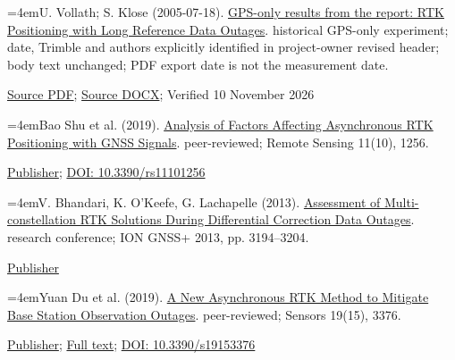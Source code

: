 \documentclass[11pt,a4paper]{article}
\numberwithin{equation}{section}
\numberwithin{figure}{section}
\begin{document}
\begin{samepage}\noindent\hangindent=4emU. Vollath; S. Klose (2005-07-18). \href{../../../references/historical-outage-results/trimble-report.pdf}{GPS-only results from the report: RTK Positioning with Long Reference Data Outages}. historical GPS-only experiment; date, Trimble and authors explicitly identified in project-owner revised header; body text unchanged; PDF export date is not the measurement date.
{\small \href{../../../references/historical-outage-results/trimble-report.pdf}{Source PDF}; \href{../../../references/historical-outage-results/trimble-report.docx}{Source DOCX}; Verified 10 November 2026\par}
\end{samepage}\medskip
\begin{samepage}\noindent\hangindent=4emBao Shu et al. (2019). \href{https://doi.org/10.3390/rs11101256}{Analysis of Factors Affecting Asynchronous RTK Positioning with GNSS Signals}. peer-reviewed; Remote Sensing 11(10), 1256.
{\small \href{https://doi.org/10.3390/rs11101256}{Publisher}; \href{https://doi.org/10.3390/rs11101256}{DOI: 10.3390/\allowbreak{}rs11101256}\par}
\end{samepage}\medskip
\begin{samepage}\noindent\hangindent=4emV. Bhandari, K. O’Keefe, G. Lachapelle (2013). \href{https://www.ion.org/publications/abstract.cfm?articleID=11153}{Assessment of Multi-constellation RTK Solutions During Differential Correction Data Outages}. research conference; ION GNSS+ 2013, pp. 3194–3204.
{\small \href{https://www.ion.org/publications/abstract.cfm?articleID=11153}{Publisher}\par}
\end{samepage}\medskip
\begin{samepage}\noindent\hangindent=4emYuan Du et al. (2019). \href{https://doi.org/10.3390/s19153376}{A New Asynchronous RTK Method to Mitigate Base Station Observation Outages}. peer-reviewed; Sensors 19(15), 3376.
{\small \href{https://doi.org/10.3390/s19153376}{Publisher}; \href{https://pmc.ncbi.nlm.nih.gov/articles/PMC6696619/}{Full text}; \href{https://doi.org/10.3390/s19153376}{DOI: 10.3390/\allowbreak{}s19153376}\par}
\end{samepage}\medskip
\end{document}
